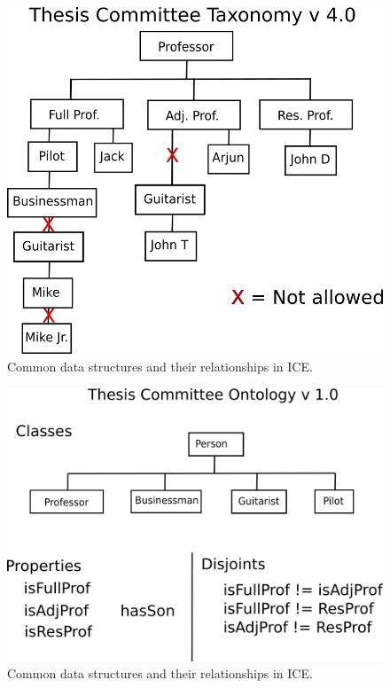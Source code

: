 \begin{figure}[htbp]
\centering
\includegraphics[width=\textwidth]{figures/tc-tax-v4-wErrors.png}
\caption{Common data structures and their relationships in ICE.}
\label{data-arch}
\end{figure}

\begin{figure}[htbp]
\centering
\includegraphics[width=\textwidth]{figures/tc-ont-classes.png}
\caption{Common data structures and their relationships in ICE.}
\label{data-arch}
\end{figure}

